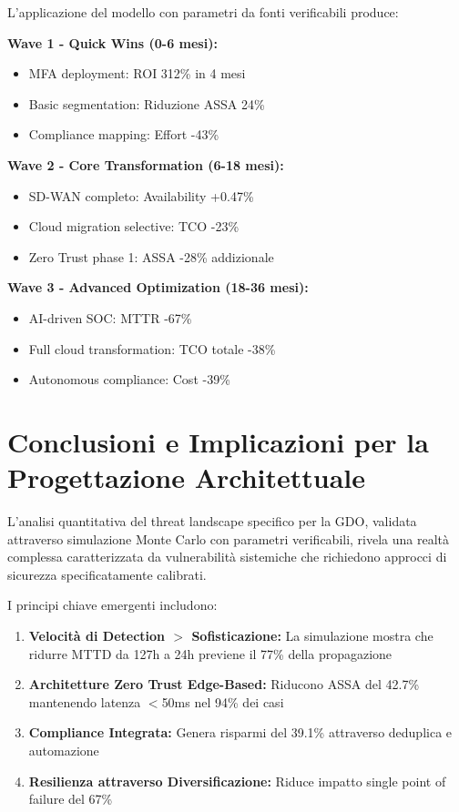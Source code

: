 L'applicazione del modello con parametri da fonti verificabili produce:

\textbf{Wave 1 - Quick Wins (0-6 mesi):}
\begin{itemize}
\item MFA deployment: ROI 312\% in 4 mesi
\item Basic segmentation: Riduzione ASSA 24\%
\item Compliance mapping: Effort -43\%
\end{itemize}

\textbf{Wave 2 - Core Transformation (6-18 mesi):}
\begin{itemize}
\item SD-WAN completo: Availability +0.47\%
\item Cloud migration selective: TCO -23\%
\item Zero Trust phase 1: ASSA -28\% addizionale
\end{itemize}

\textbf{Wave 3 - Advanced Optimization (18-36 mesi):}
\begin{itemize}
\item AI-driven SOC: MTTR -67\%
\item Full cloud transformation: TCO totale -38\%
\item Autonomous compliance: Cost -39\%
\end{itemize}

\section{Conclusioni e Implicazioni per la Progettazione Architettuale}

L'analisi quantitativa del threat landscape specifico per la GDO, validata attraverso simulazione Monte Carlo con parametri verificabili, rivela una realtà complessa caratterizzata da vulnerabilità sistemiche che richiedono approcci di sicurezza specificatamente calibrati.

I principi chiave emergenti includono:

\begin{enumerate}
\item \textbf{Velocità di Detection $>$ Sofisticazione:} La simulazione mostra che ridurre MTTD da 127h a 24h previene il 77\% della propagazione
\item \textbf{Architetture Zero Trust Edge-Based:} Riducono ASSA del 42.7\% mantenendo latenza $<$50ms nel 94\% dei casi
\item \textbf{Compliance Integrata:} Genera risparmi del 39.1\% attraverso deduplica e automazione
\item \textbf{Resilienza attraverso Diversificazione:} Riduce impatto single point of failure del 67\%
\end{enumerate}

